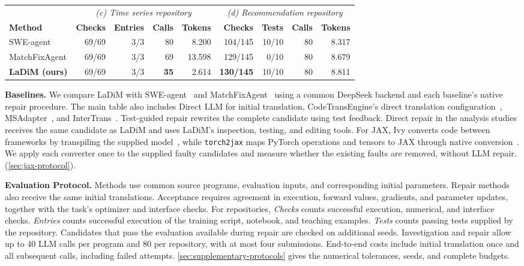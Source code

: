 \documentclass{article}
\begin{document}
\begin{table}[!t]
\begin{minipage}[t]{0.485\linewidth}
\end{minipage}
\par\medskip
\begin{tabular*}{\linewidth}{@{\extracolsep{\fill}}lrrrrrrrr@{}}
\toprule
& \multicolumn{4}{c}{\textit{(c) Time series repository}} & \multicolumn{4}{c}{\textit{(d) Recommendation repository}} \\
\cmidrule(lr){2-5}\cmidrule(l){6-9}
\textbf{Method} & \textbf{Checks} & \textbf{Entries} & \textbf{Calls} & \textbf{Tokens} & \textbf{Checks} & \textbf{Tests} & \textbf{Calls} & \textbf{Tokens} \\
\midrule
SWE-agent & 69/69 & 3/3 & 80 & 8.200 & 104/145 & 10/10 & 80 & 8.317 \\
MatchFixAgent & 69/69 & 3/3 & 69 & 13.598 & 129/145 & 0/10 & 80 & 8.679 \\
\textbf{LaDiM (ours)} & 69/69 & 3/3 & \textbf{35} & 2.614 & \textbf{130/145} & 10/10 & 80 & 8.811 \\
\bottomrule
\end{tabular*}


\end{table}

\textbf{Baselines.} We compare LaDiM with SWE-agent~\citep{yang2024sweagent} and MatchFixAgent~\citep{ibrahimzada2025matchfixagent} using a common DeepSeek backend and each baseline's native repair procedure. The main table also includes Direct LLM for initial translation, CodeTransEngine's direct translation configuration~\citep{macedo2025codetransengine}, MSAdapter~\citep{openi2025msadapter}, and InterTrans~\citep{macedo2024intertrans}. Test-guided repair rewrites the complete candidate using test feedback. Direct repair in the analysis studies receives the same candidate as LaDiM and uses LaDiM's inspection, testing, and editing tools. For JAX, Ivy converts code between frameworks by transpiling the supplied model~\citep{ivy2026transpiler}, while \texttt{torch2jax} maps PyTorch operations and tensors to JAX through native conversion~\citep{torch2jax2026}. We apply each converter once to the supplied faulty candidates and measure whether the existing faults are removed, without LLM repair. (\cref{sec:jax-protocol}).

\textbf{Evaluation Protocol.} Methods use common source programs, evaluation inputs, and corresponding initial parameters. Repair methods also receive the same initial translations. Acceptance requires agreement in execution, forward values, gradients, and parameter updates, together with the task's optimizer and interface checks. For repositories, \emph{Checks} counts successful execution, numerical, and interface checks. \emph{Entries} counts successful execution of the training script, notebook, and teaching examples. \emph{Tests} counts passing tests supplied by the repository. Candidates that pass the evaluation available during repair are checked on additional seeds. Investigation and repair allow up to 40 LLM calls per program and 80 per repository, with at most four submissions. End-to-end costs include initial translation once and all subsequent calls, including failed attempts. \cref{sec:supplementary-protocols} gives the numerical tolerances, seeds, and complete budgets.
\end{document}
